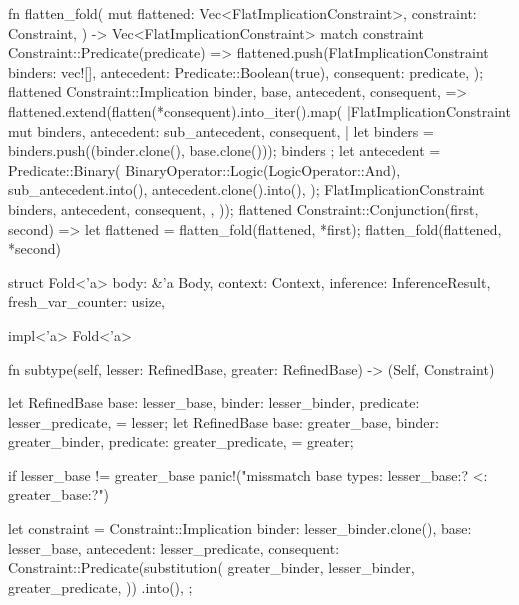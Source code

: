 \documentclass[
  oneside,
  english,
  coorientadorbanca,
  noabntexcite
]{ufsc-thesis-rn46-2019}
\begin{document}
\begin{rustcode}
fn flatten_fold(
    mut flattened: Vec<FlatImplicationConstraint>,
    constraint: Constraint,
) -> Vec<FlatImplicationConstraint> {
    match constraint {
        Constraint::Predicate(predicate) => {
            flattened.push(FlatImplicationConstraint {
                binders: vec![],
                antecedent: Predicate::Boolean(true),
                consequent: predicate,
            });
            flattened
        }
        Constraint::Implication {
            binder,
            base,
            antecedent,
            consequent,
        } => {
            flattened.extend(flatten(*consequent).into_iter().map(
                |FlatImplicationConstraint {
                      mut binders,
                      antecedent: sub_antecedent,
                      consequent,
                  }| {
                    let binders = {
                        binders.push((binder.clone(), base.clone()));
                        binders
                    };
                    let antecedent = Predicate::Binary(
                        BinaryOperator::Logic(LogicOperator::And),
                        sub_antecedent.into(),
                        antecedent.clone().into(),
                    );
                    FlatImplicationConstraint {
                        binders,
                        antecedent,
                        consequent,
                    }
                },
            ));
            flattened
        }
        Constraint::Conjunction(first, second) => {
            let flattened = flatten_fold(flattened, *first);
            flatten_fold(flattened, *second)
        }
    }
}

struct Fold<'a> {
    body: &'a Body,
    context: Context,
    inference: InferenceResult,
    fresh_var_counter: usize,
}

impl<'a> Fold<'a> {
    fn subtype(self, lesser: RefinedBase, greater: RefinedBase) -> (Self, Constraint) {
        let RefinedBase {
            base: lesser_base,
            binder: lesser_binder,
            predicate: lesser_predicate,
        } = lesser;
        let RefinedBase {
            base: greater_base,
            binder: greater_binder,
            predicate: greater_predicate,
        } = greater;

        if lesser_base != greater_base {
            panic!("missmatch base types: {lesser_base:?} <: {greater_base:?}")
        }

        let constraint = Constraint::Implication {
            binder: lesser_binder.clone(),
            base: lesser_base,
            antecedent: lesser_predicate,
            consequent: Constraint::Predicate(substitution(
                greater_binder,
                lesser_binder,
                greater_predicate,
            ))
            .into(),
        };

}}
\end{rustcode}
\end{document}
